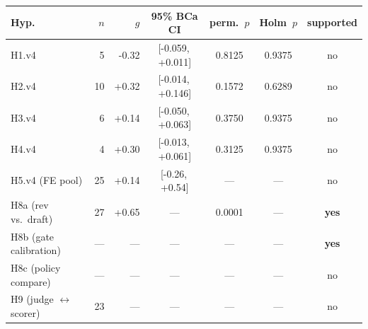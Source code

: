 \begin{tabular}{l r r c c c c}
\toprule
Hyp. & $n$ & $g$ & 95\% BCa CI & perm.~$p$ & Holm~$p$ & supported \\
\midrule
H1.v4 & 5 & -0.32 & [-0.059,\,+0.011] & 0.8125 & 0.9375 & no \\
H2.v4 & 10 & +0.32 & [-0.014,\,+0.146] & 0.1572 & 0.6289 & no \\
H3.v4 & 6 & +0.14 & [-0.050,\,+0.063] & 0.3750 & 0.9375 & no \\
H4.v4 & 4 & +0.30 & [-0.013,\,+0.061] & 0.3125 & 0.9375 & no \\
H5.v4 (FE pool) & 25 & +0.14 & [-0.26,\,+0.54] & --- & --- & no \\
H8a (rev vs.\ draft) & 27 & +0.65 & --- & 0.0001 & --- & \textbf{yes} \\
H8b (gate calibration) & --- & --- & --- & --- & --- & \textbf{yes} \\
H8c (policy compare) & --- & --- & --- & --- & --- & no \\
H9 (judge $\leftrightarrow$ scorer) & 23 & --- & --- & --- & --- & no \\
\bottomrule
\end{tabular}
